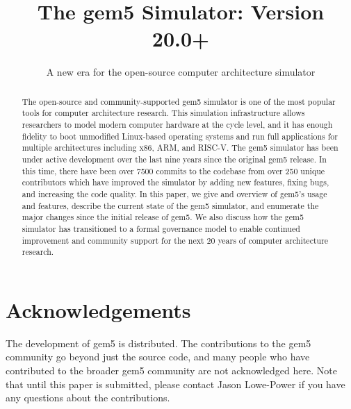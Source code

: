 \documentclass[acmlarge,nonacm,screen=true]{acmart}
\begin{document}
\title{The gem5 Simulator: Version 20.0+}
\subtitle{A new era for the open-source computer architecture simulator}
%


\begin{abstract}
    The open-source and community-supported gem5 simulator is one of the most popular tools for computer architecture research.
    This simulation infrastructure allows researchers to model modern computer hardware at the cycle level, and it has enough fidelity to boot unmodified Linux-based operating systems and run full applications for multiple architectures including x86, ARM, and RISC-V.
    The gem5 simulator has been under active development over the last nine years since the original gem5 release.
    In this time, there have been over 7500 commits to the codebase from over 250 unique contributors which have improved the simulator by adding new features, fixing bugs, and increasing the code quality.
    In this paper, we give and overview of gem5's usage and features, describe the current state of the gem5 simulator, and enumerate the major changes since the initial release of gem5.
    We also discuss how the gem5 simulator has transitioned to a formal governance model to enable continued improvement and community support for the next 20 years of computer architecture research.
\end{abstract}

\maketitle
\renewcommand{\shortauthors}{Lowe-Power and the gem5 Community}





\section{Acknowledgements}

The development of gem5 is distributed.
The contributions to the gem5 community go beyond just the source code, and many people who have contributed to the broader gem5 community are not acknowledged here.
Note that until this paper is submitted, please contact Jason Lowe-Power if you have any questions about the contributions.
\end{document}
